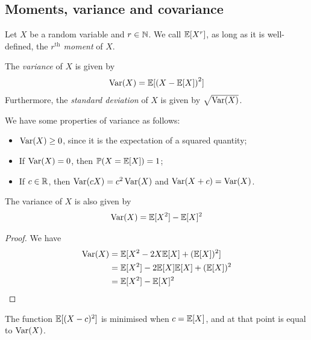 \documentclass{../template/note}
\begin{document}
    \subsection{Moments, variance and covariance}

    \begin{definition}
        Let \(X\) be a random variable and \(r \in \mathbb N\). We call \(\mathbb E[X^r]\), as long as it is well-defined, the \emph{\(r^\text{th}\) moment} of \(X\).
    \end{definition}
    
    \begin{definition}
        The \emph{variance} of \(X\) is given by
        \begin{align*}
            \operatorname{Var}(X) = \mathbb E[\left(X-\mathbb E[X]\right)^2]
        \end{align*}
        Furthermore, the \emph{standard deviation} of \(X\) is given by \(\sqrt{\operatorname{Var}(X)}\).        
    \end{definition}
    
    We have some properties of variance as follows:
    \begin{itemize}
        \item \(\operatorname{Var}(X) \geq 0\), since it is the expectation of a squared quantity;
        \item If \(\operatorname{Var}(X) = 0\), then \(\mathbb P(X = \mathbb E[X]) = 1\);
        \item If \(c \in \mathbb R\), then \(\operatorname{Var}(cX) = c^2\operatorname{Var}(X)\) and \(\operatorname{Var}(X + c) = \operatorname{Var}(X)\).
    \end{itemize}
    
    \begin{lemma}
        The variance of \(X\) is also given by
        \begin{align*}
            \operatorname{Var}(X) = \mathbb E[X^2] - \mathbb E[X]^2
        \end{align*}
    \end{lemma}
    
    \begin{proof}
        We have
        \begin{align*}
            \operatorname{Var}(X) &= \mathbb E[X^2 - 2X\mathbb E[X] + (\mathbb E[X])^2] \\
            &= \mathbb E[X^2] - 2\mathbb E[X]\mathbb E[X] + (\mathbb E[X])^2 \\
            &= \mathbb E[X^2] - \mathbb E[X]^2
        \end{align*}
    \end{proof}
    
    \begin{lemma}
        The function \(\mathbb E[(X-c)^2]\) is minimised when \(c=\mathbb E[X]\), and at that point is equal to \(\operatorname{Var}(X)\).
    \end{lemma}
    
\end{document}
